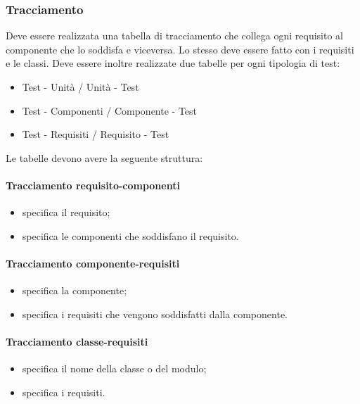 \subsubsection{Tracciamento}
Deve essere realizzata una tabella di tracciamento che collega ogni requisito al componente che lo soddisfa e viceversa. Lo stesso deve essere fatto con i requisiti e le classi.
Deve essere inoltre realizzate due tabelle per ogni tipologia di test:
\begin{itemize}
\item Test - Unità / Unità - Test
\item Test - Componenti / Componente - Test
\item Test - Requisiti / Requisito - Test
\end{itemize}

Le tabelle devono avere la seguente struttura:

\paragraph{Tracciamento requisito-componenti}
\begin{itemize}
\item {}specifica il requisito;
\item {}specifica le componenti che soddisfano il requisito.
\end{itemize}

\paragraph{Tracciamento componente-requisiti}

\begin{itemize}
\item {}specifica la componente;
\item {}specifica i requisiti che vengono soddisfatti dalla componente.
\end{itemize}

\paragraph{Tracciamento classe-requisiti}
\begin{itemize}
\item {}specifica il nome della classe o del modulo;
\item {}specifica i requisiti.
\end{itemize}

